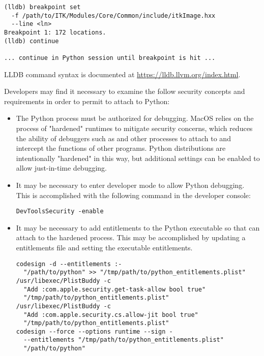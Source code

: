 \begin{enumerate}
\begin{itemize}
\begin{verbatim}
(lldb) breakpoint set
  -f /path/to/ITK/Modules/Core/Common/include/itkImage.hxx
  --line <ln>
Breakpoint 1: 172 locations.
(lldb) continue

... continue in Python session until breakpoint is hit ...
\end{verbatim}

LLDB command syntax is documented at \url{https://lldb.llvm.org/index.html}.

Developers may find it necessary to examine the follow security concepts
and requirements in order to permit  to attach to Python:

\begin{itemize}

\item The Python process must be authorized for debugging. MacOS relies on the
process of "hardened" runtimes to mitigate security concerns, which reduces
the ability of debuggers such as  and other processes to attach
to and intercept the functions of other programs. Python distributions
are intentionally "hardened" in this way, but additional settings can be
enabled to allow just-in-time debugging.

\item It may be necessary to enter developer mode to allow Python debugging.
This is accomplished with the following command in the developer console:

\begin{verbatim}
DevToolsSecurity -enable
\end{verbatim}

\item It may be necessary to add entitlements to the Python executable so that
 can attach to the hardened process. This may be accomplished by
updating a  entitlements file and setting the executable entitlements.

\begin{verbatim}
codesign -d --entitlements :-
  "/path/to/python" >> "/tmp/path/to/python_entitlements.plist"
/usr/libexec/PlistBuddy -c
  "Add :com.apple.security.get-task-allow bool true"
  "/tmp/path/to/python_entitlements.plist"
/usr/libexec/PlistBuddy -c
  "Add :com.apple.security.cs.allow-jit bool true"
  "/tmp/path/to/python_entitlements.plist"
codesign --force --options runtime --sign -
  --entitlements "/tmp/path/to/python_entitlements.plist"
  "/path/to/python"
\end{verbatim}


\end{itemize}
\end{itemize}
\end{enumerate}
